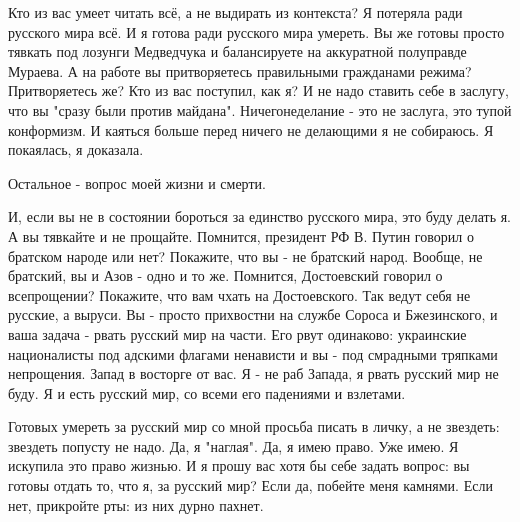 Кто из вас умеет читать всё, а не выдирать из контекста? Я потеряла ради
русского мира всё. И я готова ради русского мира умереть. Вы же готовы просто
тявкать под лозунги Медведчука и балансируете на аккуратной полуправде Мураева.
А на работе вы притворяетесь правильными гражданами режима? Притворяетесь же?
Кто из вас поступил, как я? И не надо ставить себе в заслугу, что вы "сразу
были против майдана". Ничегонеделание - это не заслуга, это тупой конформизм. И
каяться больше перед ничего не делающими я не собираюсь. Я покаялась, я
доказала.

Остальное - вопрос моей жизни и смерти.

И, если вы не в состоянии бороться за единство русского мира, это буду делать
я. А вы тявкайте и не прощайте. Помнится, президент РФ В. Путин говорил о
братском народе или нет? Покажите, что вы - не братский народ. Вообще, не
братский, вы и Азов - одно и то же. Помнится, Достоевский говорил о
всепрощении? Покажите, что вам чхать на Достоевского. Так ведут себя не
русские, а выруси. Вы - просто прихвостни на службе Сороса и Бжезинского, и
ваша задача - рвать русский мир на части. Его рвут одинаково: украинские
националисты под адскими флагами ненависти и вы - под смрадными тряпками
непрощения. Запад в восторге от вас. Я - не раб Запада, я рвать русский мир не
буду. Я и есть русский мир, со всеми его падениями и взлетами.

Готовых умереть за русский мир со мной просьба писать в личку, а не звездеть:
звездеть попусту не надо. Да, я "наглая". Да, я имею право. Уже имею. Я
искупила это право жизнью. И я прошу вас хотя бы себе задать вопрос: вы готовы
отдать то, что я, за русский мир? Если да, побейте меня камнями. Если нет,
прикройте рты: из них дурно пахнет.

